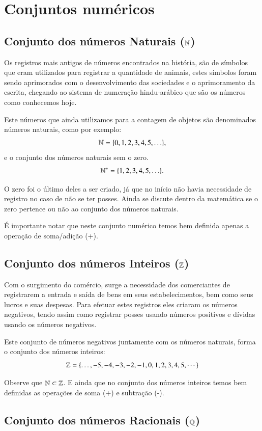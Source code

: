 \chapter{Conjuntos numéricos}

 \section{Conjunto dos números Naturais (\texorpdfstring{$\mathbb{N}$}{N})}

Os registros mais antigos de números encontrados na história, são de símbolos que eram utilizados para registrar a quantidade de animais, estes símbolos foram sendo aprimorados com o desenvolvimento das sociedades e o aprimoramento da escrita, chegando ao sistema de numeração hindu-arábico que são os números como conhecemos hoje.

Este números que ainda utilizamos para a contagem de objetos são denominados números naturais, como por exemplo:
\[\mathbb{N}= \{0, 1, 2, 3, 4, 5, \ldots \},\]
e o conjunto dos números naturais sem o zero.
\[\mathbb{N}^{*}= \{1, 2, 3, 4, 5, \ldots \}.\]

O zero foi o último deles a ser criado, já que no início não havia necessidade de registro no caso de não se ter posses.
Ainda se discute dentro da matemática se o zero pertence ou não ao conjunto dos números naturais.

É importante notar que neste conjunto numérico temos bem definida apenas a operação de soma/adição (+).

\section{Conjunto dos números Inteiros (\texorpdfstring{$\mathbb{Z}$}{Z})}

Com o surgimento do comércio, surge a necessidade dos comerciantes de registrarem a entrada e saída de bens em seus estabelecimentos, bem como seus lucros e suas despesas. Para efetuar estes registros eles criaram os números negativos, tendo assim como registrar posses usando números positivos e dívidas usando os números negativos.

Este conjunto de números negativos juntamente com os números naturais, forma o conjunto dos números inteiros:
\[\mathbb{Z}= \{ \ldots , -5, -4, -3, -2, -1, 0, 1, 2, 3, 4, 5, \cdots \}\]

Observe que $\mathbb{N} \subset \mathbb{Z}$. E ainda que no conjunto dos números inteiros temos bem definidas as operações de soma (+) e subtração (-).

\section{Conjunto dos números Racionais (\texorpdfstring{$\mathbb{Q}$}{Q})}

